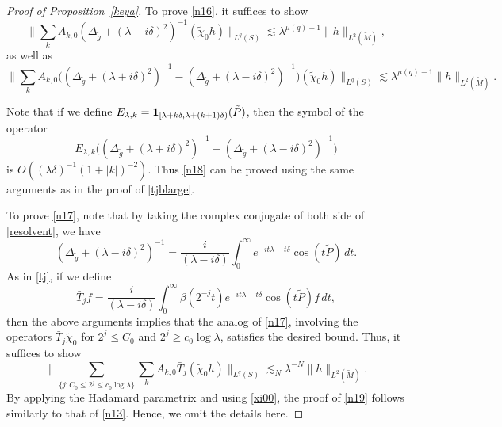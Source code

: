 \documentclass[10pt]{amsart}
\newcommand{\la}{\lambda}
\newcommand{\one}{{\bf 1}}
\newcommand{\1}{{\bf 1}}
\begin{document}
\begin{proof}[Proof of Proposition~\ref{keya}]
To prove \eqref{n16}, it suffices to show 
\begin{equation}\label{n17}
    \|\sum_{k}A_{k,0} (\Delta_{\tilde g}+(\la-i\delta)^2)^{-1} (\tilde \chi_0 h)\|_{L^q(S)}\lesssim 
    \la^{\mu(q)-1}\|h\|_{L^2(\tilde M)},
\end{equation}
as well as 
\begin{equation}\label{n18}
    \|\sum_{k}A_{k,0} \big((\Delta_{\tilde g}+(\la+i\delta)^2)^{-1}-(\Delta_{\tilde g}+(\la-i\delta)^2)^{-1} \big) (\tilde \chi_0 h)\|_{L^q(S)}\lesssim 
    \la^{\mu(q)-1}\|h\|_{L^2(\tilde M)}.
\end{equation}


Note that if we define
$E_{\la,k}=\one_{[\la+k\delta, \la +(k+1)\delta)}( \tilde P)$, then
the symbol of the operator
$$
E_{\la,k} \big((\Delta_{\tilde g}+(\la+i\delta)^2)^{-1}-(\Delta_{\tilde g}+(\la-i\delta)^2)^{-1} \big)
$$
is $O\left((\la\delta)^{-1}(1+|k|)^{-2}\right )$. Thus \eqref{n18} can be proved using the same arguments as in the proof of \eqref{tjblarge}.


To prove \eqref{n17}, note that by taking the complex conjugate of both side of \eqref{resolvent}, we have 
\begin{equation}
    \left(\Delta_{\tilde g}+(\la-i\delta)^2\right)^{-1}=\frac i{(\la-i\delta)}\int_0^\infty e^{-it\la-t\delta}\cos (t\tilde P)\,dt.
\end{equation}
As in \eqref{tj}, if we define 
\begin{equation}\label{tj1}
\bar T_j f=\frac i{(\la-i\delta)}\int_0^\infty \beta(2^{-j}t)e^{-it\la-t\delta}\cos (t\tilde P)f\,dt,
\end{equation}
then the above arguments implies that the analog of \eqref{n17}, involving the operators $\bar T_j\tilde \chi_0$ for $2^j\le C_0$ and $2^j\ge c_0\log\la$, satisfies the desired bound. Thus, it suffices to show 
\begin{equation}\label{n19}
        \|\sum_{\{j:C_0\le 2^j\le c_0\log\la\}}\sum_{k}A_{k,0} \bar T_j(\tilde \chi_0 h)\|_{L^q(S)}\lesssim_N 
    \la^{-N}\|h\|_{L^2(\tilde M)}.
\end{equation}
By applying the Hadamard parametrix and using \eqref{xi00}, the proof of \eqref{n19}  follows similarly to that of \eqref{n13}. Hence, we omit the details here.
\end{proof} 
\end{document}
